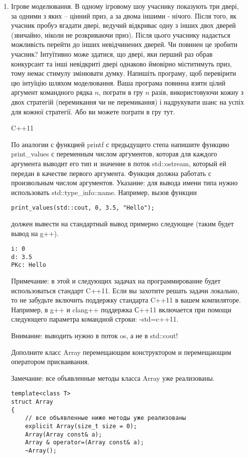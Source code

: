 \documentclass[]{article}
\begin{document}
\begin{enumerate}
\item Ігрове моделювання.
В одному ігровому шоу учаснику показують три двері, за одними з яких -- цінний приз, а за двома іншими - нічого.
Після того, як учасник пробуэ вгадати двері, ведучий відкриває одну з інших двох дверей (звичайно, ніколи не розкриваючи приз).
Після цього учаснику надається можливість перейти до інших невідчинених дверей.
Чи повинен це зробити учасник? Інтуїтивно може здатися, що двері, яки перший раз обрав конкурсант та інші невідкриті двері однаково ймовірно міститимуть приз, тому немає стимулу змінювати думку.
Напишіть програму, щоб перевірити цю інтуїцію шляхом моделювання.
 Ваша програма повинна взяти цілий аргумент командного рядка $n$, пограти в гру $n$ разів,
використовуючи кожну з двох стратегій (перемикання чи не перемикання) і надрукувати шанс на успіх для кожної стратегії.
Або ви можете пограти в гру тут.



C++11



По аналогии с функцией printf с предыдущего степа напишите функцию print\_values с переменным числом аргументов, которая для каждого аргумента выводит его тип и значение в поток std::ostream, который ей передан в качестве первого аргумента. Функция должна работать с произвольным числом аргументов.
Указание: для вывода имени типа нужно использовать std::type\_info::name.
Например, вызов функции
\begin{verbatim}
print_values(std::cout, 0, 3.5, "Hello");
\end{verbatim}
должен вывести на стандартный вывод примерно следующее (таким будет вывод на g++).
\begin{verbatim}
i: 0
d: 3.5
PKc: Hello
\end{verbatim}

Примечание: в этой и следующих задачах на программирование будет использоваться стандарт C++11. Если вы захотите решать задачи локально, то не забудьте включить поддержку стандарта C++11 в вашем компиляторе. Например, в g++ и clang++ поддержка С++11 включается при помощи следующего параметра командной строки: -std=c++11.

Внимание: выводить нужно в поток os, а не в std::cout!




Дополните класс Array перемещающим конструктором и перемещающим оператором присваивания.

Замечание: все объявленные методы класса Array уже реализованы.
\begin{verbatim}
template<class T>
struct Array
{
    // все объявленные ниже методы уже реализованы
    explicit Array(size_t size = 0);
    Array(Array const& a);
    Array & operator=(Array const& a);
    ~Array();


\end{verbatim}
\end{enumerate}
\end{document}

